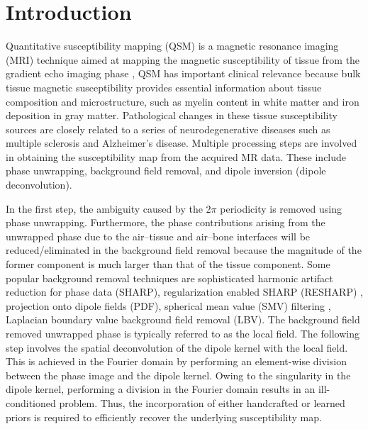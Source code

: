 \documentclass[sn-vancouver,Numbered]{sn-jnl}%
\begin{document}

\maketitle
\section{Introduction}\label{sec1}

 Quantitative susceptibility mapping (QSM) is a magnetic resonance imaging (MRI) technique aimed at mapping the magnetic susceptibility of tissue from the gradient echo imaging phase \cite{deistung2017overview,schweser2016foundations,liu2015quantitative,reichenbach2015quantitative}, QSM has important clinical relevance because bulk tissue magnetic susceptibility provides essential information about tissue composition and microstructure, such as myelin content in white matter and iron deposition in gray matter. Pathological changes in these tissue susceptibility sources are closely related to a series of neurodegenerative diseases such as multiple sclerosis and Alzheimer’s disease. Multiple processing steps are involved in obtaining the susceptibility map from the acquired MR data. These  include phase unwrapping, background field removal, and dipole inversion (dipole deconvolution). 

In the first step, the ambiguity caused by the 2$\pi$ periodicity is removed using phase unwrapping. Furthermore, the phase contributions arising from the unwrapped phase due to the air–tissue and air–bone interfaces will be reduced/eliminated in the background field removal because the magnitude of the former component is much larger than that of the tissue component. Some popular background removal techniques are sophisticated harmonic artifact reduction for phase data (SHARP)\cite{schweser2010sophisticated}, regularization enabled SHARP (RESHARP) \cite{sun2014background}, projection onto dipole fields (PDF)\cite{liu2011novel}, spherical mean value (SMV) filtering \cite{wen2014iterative}, Laplacian boundary value background field removal (LBV)\cite{zhou2014background}. The background field removed unwrapped phase is typically referred to as the local field. The following step involves the spatial deconvolution of the dipole kernel with the local field. This is achieved in the Fourier domain by performing an element-wise division between the phase image and the dipole kernel. Owing to the singularity in the dipole kernel, performing a division in the Fourier domain results in an ill-conditioned problem. Thus,  the incorporation of either handcrafted or learned priors is required to efficiently recover the underlying susceptibility map.  
\end{document}
